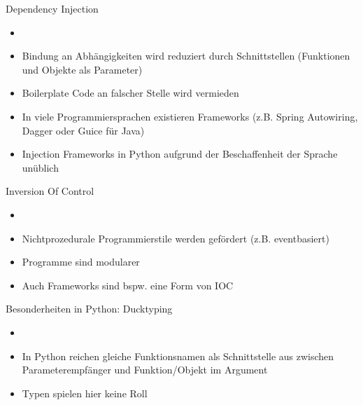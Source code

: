 \begin{frame}{Dependency Injection}
 \begin{itemize}
        \setlength{\itemindent}{1.3in}
        \item [\textbf{Dependency Injection}]
    \end{itemize}

    \begin{itemize}
        \item Bindung an Abhängigkeiten wird reduziert durch Schnittstellen (Funktionen und Objekte als Parameter)
        \item Boilerplate Code an falscher Stelle wird vermieden
        \item In viele Programmiersprachen existieren Frameworks (z.B. Spring Autowiring, Dagger oder Guice für Java) 
        \item Injection Frameworks in Python aufgrund der Beschaffenheit der Sprache unüblich
   \end{itemize}
   
\end{frame}


\begin{frame}{Inversion Of Control}
\begin{itemize}
        \setlength{\itemindent}{1.25in}
        \item [\textbf{Inversion Of Control}]
    \end{itemize}

    \begin{itemize}
        \item Nichtprozedurale Programmierstile werden gefördert (z.B. eventbasiert)
        \item Programme sind modularer
        \item Auch Frameworks sind bspw. eine Form von IOC
   \end{itemize}

\end{frame}

 
\begin{frame}{Besonderheiten in Python: Ducktyping}
  \begin{itemize}
        \setlength{\itemindent}{1.2in}
        \item [\textbf{Recap: Ducktyping}]
    \end{itemize}

    \begin{itemize}
        \item In Python reichen gleiche Funktionsnamen als Schnittstelle aus zwischen Parameterempfänger und Funktion/Objekt im Argument
        \item Typen spielen hier keine Roll
    \end{itemize}

  \end{frame}
  
